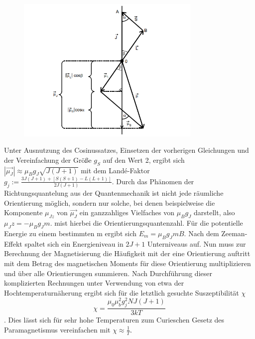 \begin{figure}[H]
    \centering
    \captionsetup{justification=centering}
    \includegraphics[height=7cm]{"Vektor_Paramagnetismus.png"}
    \label{Fig:Vektor}
\end{figure}
Unter Ausnutzung des Cosinussatzes, Einsetzen der vorherigen Gleichungen und der Vereinfachung der Größe $g_S$ auf den Wert 2, ergibt sich $|\vec{\mu_J}|\approx\mu_Bg_J\sqrt{J(J+1)}$ mit dem Land\'{e}-Faktor $g_j:=\frac{3J(J+1)+[S(S+1)-L(L+1)]}{2J(J+1)}$. Durch das Phänomen der Richtungsquantelung aus der Quantenmechanik ist nicht jede räumliche Orientierung möglich, sondern nur solche, bei denen beispielweise die Komponente $\mu_{Jz}$ von $\vec{\mu_J}$ ein ganzzahliges Vielfaches von $\mu_Bg_J$ darstellt, also $\mu_Jz=-\mu_Bg_Jm$. mist hierbei die Orientierungsquantenzahl. Für die potentielle Energie zu einem bestimmten m ergibt sich $E_m=\mu_Bg_JmB$. Nach dem Zeeman-Effekt spaltet sich ein Energieniveau in $2J+1$ Unterniveaus auf. Nun muss zur Berechnung der Magnetisierung die Häufigkeit mit der eine Orientierung auftritt mit dem Betrag des magnetischen Moments für diese Orientierung multiplizieren und über alle Orientierungen summieren. Nach Durchführung dieser komplizierten Rechnungen unter Verwendung von etwa der Hochtemperaturnäherung ergibt sich für die letztlich gesuchte Suszeptibilität $\chi$
\begin{equation}
    \chi=\frac{\mu_0\mu_b^2g_j^2NJ(J+1)}{3kT} \label{Chi}
\end{equation}.
Dies lässt sich für sehr hohe Temperaturen zum Curieschen Gesetz des Paramagnetismus vereinfachen mit $\chi\approx\frac{1}{T}$.
